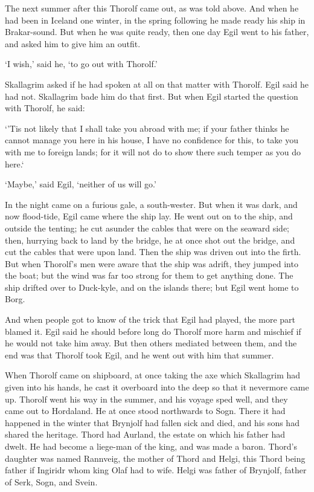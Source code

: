 The next summer after this Thorolf came out, as was told above. And when he had been in Iceland one winter, in the spring following he made ready his ship in Brakar-sound. But when he was quite ready, then one day Egil went to his father, and asked him to give him an outfit.

`I wish,' said he, `to go out with Thorolf.'

Skallagrim asked if he had spoken at all on that matter with Thorolf. Egil said he had not. Skallagrim bade him do that first. But when Egil started the question with Thorolf, he said:

`'Tis not likely that I shall take you abroad with me; if your father thinks he cannot manage you here in his house, I have no confidence for this, to take you with me to foreign lands; for it will not do to show there such temper as you do here.`

`Maybe,' said Egil, `neither of us will go.'

In the night came on a furious gale, a south-wester. But when it was dark, and now flood-tide, Egil came where the ship lay. He went out on to the ship, and outside the tenting; he cut asunder the cables that were on the seaward side; then, hurrying back to land by the bridge, he at once shot out the bridge, and cut the cables that were upon land. Then the ship was driven out into the firth. But when Thorolf's men were aware that the ship was adrift, they jumped into the boat; but the wind was far too strong for them to get anything done. The ship drifted over to Duck-kyle, and on the islands there; but Egil went home to Borg.

And when people got to know of the trick that Egil had played, the more part blamed it. Egil said he should before long do Thorolf more harm and mischief if he would not take him away. But then others mediated between them, and the end was that Thorolf took Egil, and he went out with him that summer.

When Thorolf came on shipboard, at once taking the axe which Skallagrim had given into his hands, he cast it overboard into the deep so that it nevermore came up. Thorolf went his way in the summer, and his voyage sped well, and they came out to Hordaland. He at once stood northwards to Sogn. There it had happened in the winter that Brynjolf had fallen sick and died, and his sons had shared the heritage. Thord had Aurland, the estate on which his father had dwelt. He had become a liege-man of the king, and was made a baron. Thord's daughter was named Rannveig, the mother of Thord and Helgi, this Thord being father if Ingiridr whom king Olaf had to wife. Helgi was father of Brynjolf, father of Serk, Sogn, and Svein.
